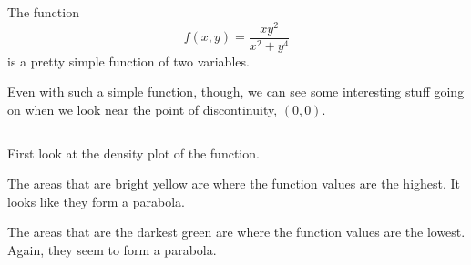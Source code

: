 \documentclass[aspectratio=169]{beamer}
\begin{document}
\begin{frame}
    The function
    \[f(x,y) = \frac{xy^2}{x^2 + y^4}\]
    is a pretty simple function of two variables. 
    \pause
    \vspace{2\baselineskip}

    Even with such a simple function, though, we can see some interesting stuff
    going on when we look near the point of discontinuity, $(0,0)$.
\end{frame}
\begin{frame}[plain]
    \begin{columns}[T]
        \begin{column}{6.3cm}
            First look at the density plot of the function.\pause

            The areas that are bright yellow are where the function values are
            the highest. It looks like they form a parabola.\pause

            The areas that are the darkest green are where the function values
            are the lowest. Again, they seem to form a parabola.
        \end{column}
    \end{columns}
\end{frame}
\end{document}
